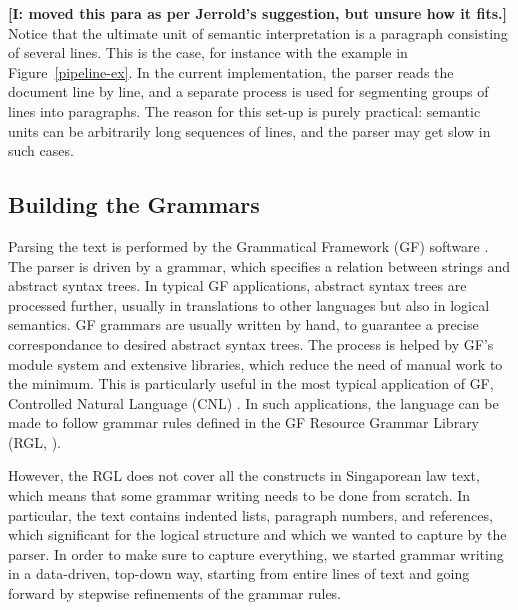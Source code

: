 \documentclass{IOS-Book-Article}
\newcommand{\todoj}[1]{{\color{red}\textbf{[J: #1]}}}
\newcommand{\todoi}[1]{{\color{magenta}\textbf{[I: #1]}}}
\begin{document}

\todoi{moved this para as per Jerrold's suggestion, but unsure how it fits.}
Notice that the ultimate unit of semantic interpretation is a paragraph consisting of several lines. This is the case, for instance with the example in Figure~\ref{pipeline-ex}.
In the current implementation, the parser reads the document line by line, and a separate process is used for segmenting groups of lines into paragraphs.
The reason for this set-up is purely practical: semantic units can be arbitrarily long sequences of lines, and the parser may get slow in such cases.

\subsection{Building the Grammars}

Parsing the text is performed by the Grammatical Framework (GF) software \cite{ranta-2011}.
The parser is driven by a grammar, which specifies a relation between strings and abstract syntax trees. In typical GF applications, abstract syntax trees are processed further, usually in translations to other languages but also in logical semantics. GF grammars are usually written by hand, to guarantee a precise correspondance to desired abstract syntax trees. The process is helped by GF's module system and extensive libraries, which reduce the need of manual work to the minimum. This is particularly useful in the most typical application of GF, Controlled Natural Language (CNL) \cite{fuchs-al-2008,angelov-ranta-2009}. In such applications, the language can be made to follow grammar rules defined in the GF Resource Grammar Library (RGL, \cite{ranta-2009}).

However, the RGL does not cover all the constructs in Singaporean law text, which means that some grammar writing needs to be done from scratch. In particular, the text contains indented lists, paragraph numbers, and references, which significant for the logical structure and which we wanted to capture by the parser. In order to make sure to capture everything, we started grammar writing in a data-driven, top-down way, starting from entire lines of text and going forward by stepwise refinements of the grammar rules.
\end{document}
